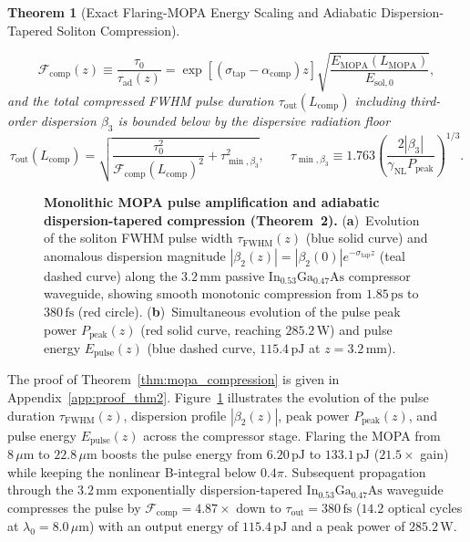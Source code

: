 \documentclass[11pt,letterpaper]{article}
\newtheorem{theorem}{Theorem}
\begin{document}
\begin{theorem}[Exact Flaring-MOPA Energy Scaling and Adiabatic Dispersion-Tapered Soliton Compression]
\begin{enumerate}
    \begin{equation}
    \mathcal{F}_{\mathrm{comp}}(z) \equiv \frac{\tau_0}{\tau_{\mathrm{ad}}(z)} = \exp\!\left[ \left(\sigma_{\mathrm{tap}} - \alpha_{\mathrm{comp}}\right) z \right] \sqrt{\frac{E_{\mathrm{MOPA}}(L_{\mathrm{MOPA}})}{E_{\mathrm{sol},0}}},
    \label{eq:thm2_comp_factor}
    \end{equation}
    and the total compressed FWHM pulse duration $\tau_{\mathrm{out}}(L_{\mathrm{comp}})$ including third-order dispersion $\beta_3$ is bounded below by the dispersive radiation floor
    \begin{equation}
    \tau_{\mathrm{out}}(L_{\mathrm{comp}}) = \sqrt{\frac{\tau_0^2}{\mathcal{F}_{\mathrm{comp}}(L_{\mathrm{comp}})^2} + \tau_{\min,\beta_3}^2}, \qquad \tau_{\min,\beta_3} \equiv 1.763\left(\frac{2|\beta_3|}{\gamma_{\mathrm{NL}} P_{\mathrm{peak}}}\right)^{1/3}.
    \label{eq:thm2_tau_min}
    \end{equation}
\end{enumerate}
\end{theorem}

\begin{figure}[t!]
\centering
\resizebox{0.97\textwidth}{!}{}
\caption{\textbf{Monolithic MOPA pulse amplification and adiabatic dispersion-tapered compression (Theorem~2).} (\textbf{a})~Evolution of the soliton FWHM pulse width $\tau_{\mathrm{FWHM}}(z)$ (blue solid curve) and anomalous dispersion magnitude $|\beta_2(z)| = |\beta_2(0)|e^{-\sigma_{\mathrm{tap}} z}$ (teal dashed curve) along the $3.2\,\mathrm{mm}$ passive $\mathrm{In}_{0.53}\mathrm{Ga}_{0.47}\mathrm{As}$ compressor waveguide, showing smooth monotonic compression from $1.85\,\mathrm{ps}$ to $380\,\mathrm{fs}$ (red circle). (\textbf{b})~Simultaneous evolution of the pulse peak power $P_{\mathrm{peak}}(z)$ (red solid curve, reaching $285.2\,\mathrm{W}$) and pulse energy $E_{\mathrm{pulse}}(z)$ (blue dashed curve, $115.4\,\mathrm{pJ}$ at $z = 3.2\,\mathrm{mm}$).}
\label{fig:mopa_compression}
\end{figure}

The proof of Theorem~\ref{thm:mopa_compression} is given in Appendix~\ref{app:proof_thm2}. Figure~\ref{fig:mopa_compression} illustrates the evolution of the pulse duration $\tau_{\mathrm{FWHM}}(z)$, dispersion profile $|\beta_2(z)|$, peak power $P_{\mathrm{peak}}(z)$, and pulse energy $E_{\mathrm{pulse}}(z)$ across the compressor stage. Flaring the MOPA from $8\,\mu\mathrm{m}$ to $22.8\,\mu\mathrm{m}$ boosts the pulse energy from $6.20\,\mathrm{pJ}$ to $133.1\,\mathrm{pJ}$ ($21.5\times$ gain) while keeping the nonlinear B-integral below $0.4\pi$. Subsequent propagation through the $3.2\,\mathrm{mm}$ exponentially dispersion-tapered $\mathrm{In}_{0.53}\mathrm{Ga}_{0.47}\mathrm{As}$ waveguide compresses the pulse by $\mathcal{F}_{\mathrm{comp}} = 4.87\times$ down to $\tau_{\mathrm{out}} = 380\,\mathrm{fs}$ ($14.2$ optical cycles at $\lambda_0 = 8.0\,\mu\mathrm{m}$) with an output energy of $115.4\,\mathrm{pJ}$ and a peak power of $285.2\,\mathrm{W}$.
\end{document}
